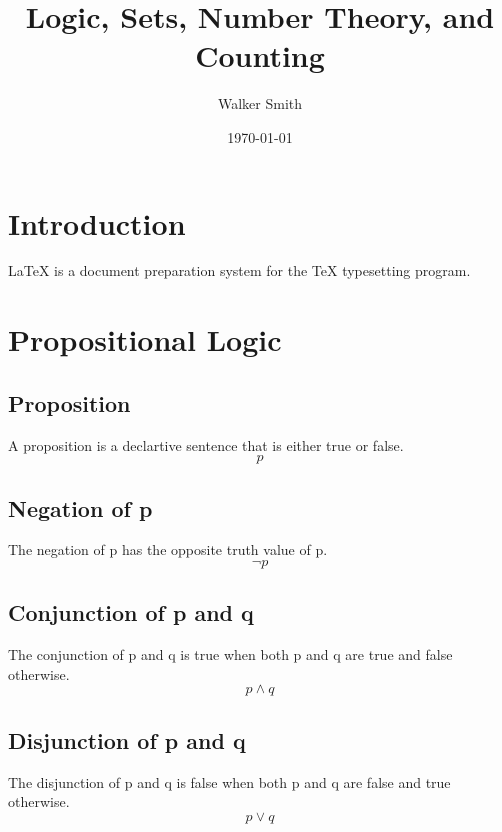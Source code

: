 \documentclass[12pt]{article}
\title{Logic, Sets, Number Theory, and Counting}
\date{\today}
\author{Walker Smith}
\begin{document}
\maketitle
\pagebreak

\tableofcontents{}
\pagebreak

%
%
%
%
\section{Introduction}
\LaTeX{} is 
a 
document
preparation
system
for
the
\TeX{}
typesetting
program.

%
%
%
%
%
%
\pagebreak
\section{Propositional Logic}

\subsection{Proposition}
A proposition is a declartive sentence 
that is either true or false.
\begin{equation}
p
\end{equation}

\subsection{Negation of p}
The negation of p 
has the opposite truth value of p.
\begin{equation}
\neg p
\end{equation}

\subsection{Conjunction of p and q}
The conjunction of p and q
is true
when
both p and q are true
and false otherwise.
\begin{equation}
p \wedge q
\end{equation}

\subsection{Disjunction of p and q}
The disjunction of p and q
is false
when
both p and q are false
and true otherwise.
\begin{equation}
p \lor q
\end{equation}
\end{document}

